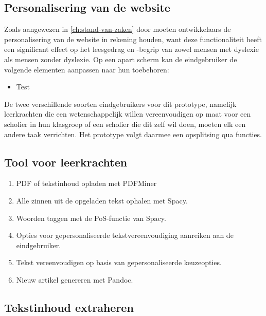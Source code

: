 \subsection{Personalisering van de website}


Zoals aangewezen in \ref{ch:stand-van-zaken} door \textcite{Harvard2023} moeten ontwikkelaars de personalisering van de website in rekening houden, want deze functionaliteit heeft een significant effect op het leesgedrag en -begrip van zowel mensen met dyslexie als mensen zonder dyslexie. Op een apart scherm kan de eindgebruiker de volgende elementen aanpassen naar hun toebehoren:

\begin{itemize}
\item Test
\end{itemize}


De twee verschillende soorten eindgebruikers voor dit prototype, namelijk leerkrachten die een wetenschappelijk willen vereenvoudigen op maat voor een scholier in hun klasgroep of een scholier die dit zelf wil doen, moeten elk een andere taak verrichten. Het prototype volgt daarmee een opsplitsing qua functies.


\subsection{Tool voor leerkrachten}

\begin{enumerate}
	\item PDF of tekstinhoud opladen met PDFMiner
	\item Alle zinnen uit de opgeladen tekst ophalen met Spacy.
	\item Woorden taggen met de PoS-functie van Spacy.
	\item Opties voor gepersonaliseerde tekstvereenvoudiging aanreiken aan de eindgebruiker.
	\item Tekst vereenvoudigen op basis van gepersonaliseerde keuzeopties.
	\item Nieuw artikel genereren met Pandoc.
\end{enumerate}

\subsection{Tekstinhoud extraheren}

